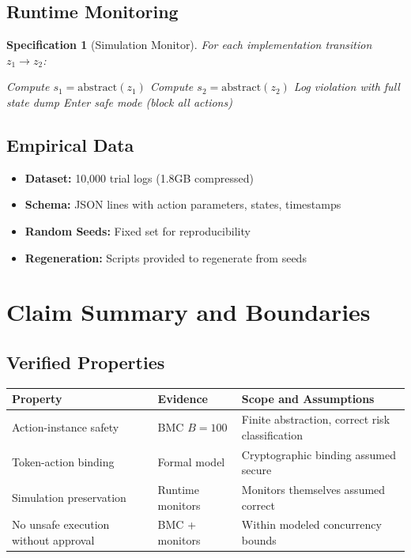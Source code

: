 \documentclass[12pt]{article}
\newtheorem{spec}{Specification}[section]
\begin{document}
\subsection{Runtime Monitoring}

\begin{spec}[Simulation Monitor]
For each implementation transition $z_1 \to z_2$:
\begin{algorithmic}[1]
\STATE Compute $s_1 = \text{abstract}(z_1)$
\STATE Compute $s_2 = \text{abstract}(z_2)$
    \STATE Log violation with full state dump
    \STATE Enter safe mode (block all actions)
\ENDIF
\end{algorithmic}
\end{spec}

\subsection{Empirical Data}

\begin{itemize}
    \item \textbf{Dataset:} 10,000 trial logs (1.8GB compressed)
    \item \textbf{Schema:} JSON lines with action parameters, states, timestamps
    \item \textbf{Random Seeds:} Fixed set for reproducibility
    \item \textbf{Regeneration:} Scripts provided to regenerate from seeds
\end{itemize}

\section{Claim Summary and Boundaries}

\subsection{Verified Properties}

\begin{center}
\begin{tabular}{@{}p{}p{}p{}@{}}
\toprule
\textbf{Property} & \textbf{Evidence} & \textbf{Scope and Assumptions} \\
\midrule
Action-instance safety & BMC $B=100$ & Finite abstraction, correct risk classification \\
Token-action binding & Formal model & Cryptographic binding assumed secure \\
Simulation preservation & Runtime monitors & Monitors themselves assumed correct \\
No unsafe execution without approval & BMC + monitors & Within modeled concurrency bounds \\
\bottomrule
\end{tabular}
\end{center}
\end{document}
